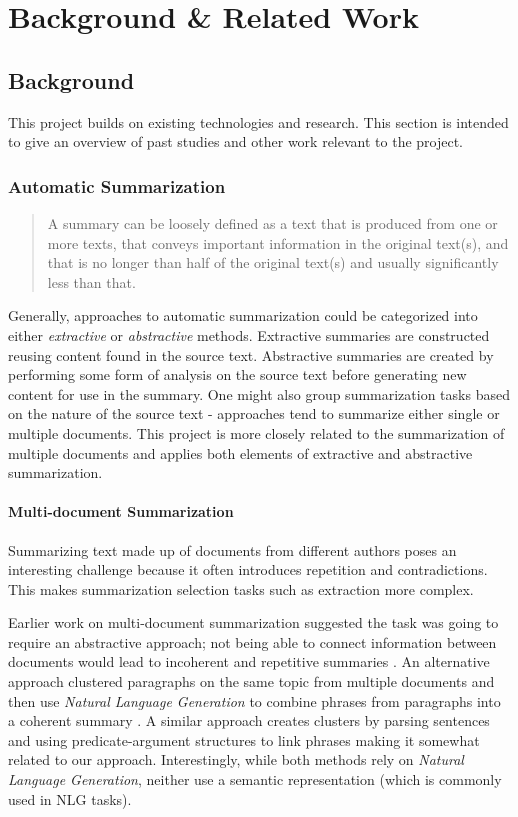 \chapter{Background \& Related Work\label{chap:background-related}}
  \section{Background}
    This project builds on existing technologies and research. This section is intended to give an overview of past studies and other work relevant to the project.

    \tocless\subsection{Automatic Summarization}
      \blockquote{A summary can be loosely defined as a text that is produced from one or more texts, that conveys important information in the original text(s), and that is no longer than half of the original text(s) and usually significantly less than that.} \cite{radev2002introduction}

      Generally, approaches to automatic summarization could be categorized into either \textit{extractive} or \textit{abstractive} methods. Extractive summaries are constructed reusing content found in the source text. Abstractive summaries are created by performing some form of analysis on the source text before generating new content for use in the summary. One might also group summarization tasks based on the nature of the source text - approaches tend to summarize either single or multiple documents. This project is more closely related to the summarization of multiple documents and applies both elements of extractive and abstractive summarization.

      \tocless\subsubsection{Multi-document Summarization}

        Summarizing text made up of documents from different authors poses an interesting challenge because it often introduces repetition and contradictions. This makes summarization selection tasks such as extraction more complex.

        Earlier work on multi-document summarization suggested the task was going to require an abstractive approach; not being able to connect information between documents would lead to incoherent and repetitive summaries \cite{McKeown1999TMS315149315355}. An alternative approach clustered paragraphs on the same topic from multiple documents and then use \textit{Natural Language Generation} to combine phrases from paragraphs into a coherent summary \cite{McKeown1999TMS315149315355}. A similar approach creates clusters by parsing sentences and using predicate-argument structures to link phrases \cite{barzilay1999information} making it somewhat related to our approach. Interestingly, while both methods rely on \textit{Natural Language Generation}, neither use a semantic representation (which is commonly used in NLG tasks).

